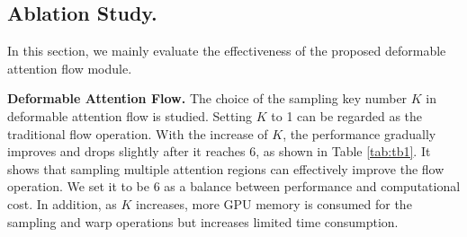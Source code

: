 \documentclass[runningheads]{llncs}
\begin{document}
\subsection{Ablation Study.}
In this section, we mainly evaluate the effectiveness of the proposed deformable attention flow module.

\textbf{Deformable Attention Flow.} 
The choice of the sampling key number $K$ in deformable attention flow is studied. Setting $K$ to 1 can be regarded as the traditional flow operation. With the increase of $K$, the performance gradually improves and drops slightly after it reaches 6, as shown in Table \ref{tab:tb1}. It shows that sampling multiple attention regions can effectively improve the flow operation. We set it to be 6 as a balance between performance and computational cost. In addition, as $K$ increases, more GPU memory is consumed for the sampling and warp operations but increases limited time consumption.

\begin{table*}[t]

\end{table*}
\end{document}
